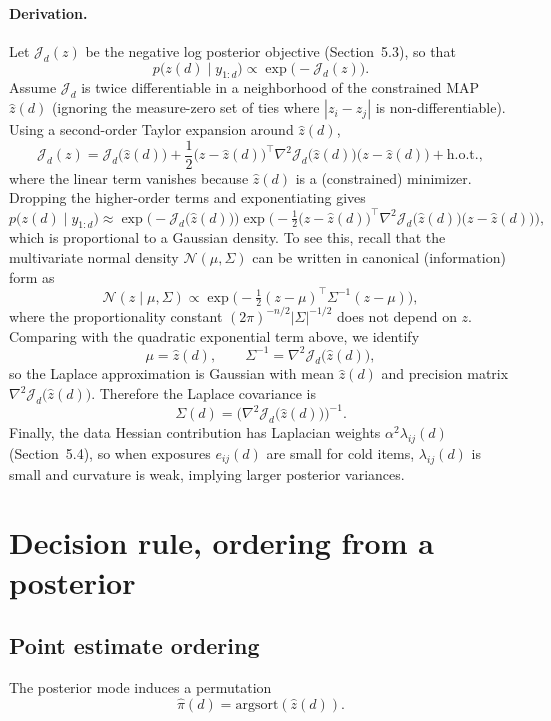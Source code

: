 \documentclass[11pt]{article}
\begin{document}
\paragraph{Derivation.}
Let $\mathcal J_d(z)$ be the negative log posterior objective (Section~5.3), so that
\[
p\big(z(d)\mid y_{1:d}\big) \propto \exp\big(-\mathcal J_d(z)\big).
\]
Assume $\mathcal J_d$ is twice differentiable in a neighborhood of the constrained MAP $\widehat z(d)$ (ignoring the measure-zero set of ties where $|z_i-z_j|$ is non-differentiable).
Using a second-order Taylor expansion around $\widehat z(d)$,
\[
\mathcal J_d(z)
=
\mathcal J_d\big(\widehat z(d)\big)
+\frac12\big(z-\widehat z(d)\big)^\top \nabla^2 \mathcal J_d\big(\widehat z(d)\big)\big(z-\widehat z(d)\big)
+\text{h.o.t.},
\]
where the linear term vanishes because $\widehat z(d)$ is a (constrained) minimizer.
Dropping the higher-order terms and exponentiating gives
\[
p\big(z(d)\mid y_{1:d}\big)
\approx
\exp\Big(-\mathcal J_d\big(\widehat z(d)\big)\Big)
\exp\!\Big(-\tfrac12\big(z-\widehat z(d)\big)^\top \nabla^2 \mathcal J_d\big(\widehat z(d)\big)\big(z-\widehat z(d)\big)\Big),
\]
which is proportional to a Gaussian density.
To see this, recall that the multivariate normal density $\mathcal N(\mu,\Sigma)$ can be written in canonical (information) form as
\[
\mathcal N(z\mid \mu,\Sigma)
\propto
\exp\!\Big(-\tfrac12(z-\mu)^\top \Sigma^{-1}(z-\mu)\Big),
\]
where the proportionality constant $(2\pi)^{-n/2}|\Sigma|^{-1/2}$ does not depend on $z$.
Comparing with the quadratic exponential term above, we identify
\[
\mu=\widehat z(d),
\qquad
\Sigma^{-1}=\nabla^2 \mathcal J_d\big(\widehat z(d)\big),
\]
so the Laplace approximation is Gaussian with mean $\widehat z(d)$ and precision matrix $\nabla^2 \mathcal J_d\big(\widehat z(d)\big)$.
Therefore the Laplace covariance is
\[
\Sigma(d)=\Big(\nabla^2 \mathcal J_d\big(\widehat z(d)\big)\Big)^{-1}.
\]
Finally, the data Hessian contribution has Laplacian weights $\alpha^2\lambda_{ij}(d)$ (Section~5.4), so when exposures $e_{ij}(d)$ are small for cold items, $\lambda_{ij}(d)$ is small and curvature is weak, implying larger posterior variances.

\section{Decision rule, ordering from a posterior}

\subsection{Point estimate ordering}
The posterior mode induces a permutation
\[
\widehat \pi(d)=\mathrm{argsort}(\widehat z(d)).
\]
\end{document}
